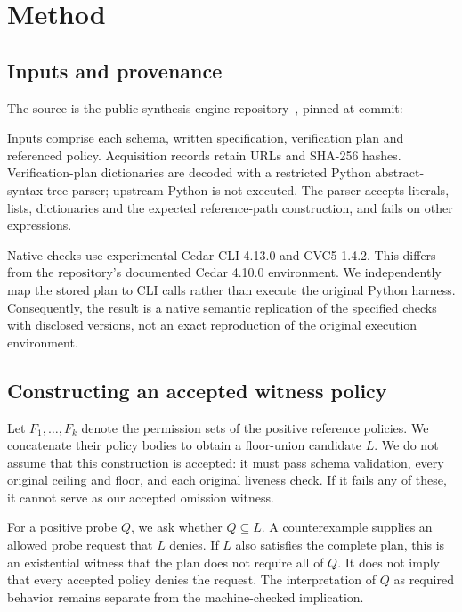 \documentclass[sigconf,nonacm]{acmart}
\begin{document}
\section{Method}
\subsection{Inputs and provenance}
The source is the public synthesis-engine repository~\cite{artifact}, pinned at commit:
\par{}\par
Inputs comprise each schema, written specification, verification plan and referenced policy. Acquisition records retain URLs and SHA-256 hashes. Verification-plan dictionaries are decoded with a restricted Python abstract-syntax-tree parser; upstream Python is not executed. The parser accepts literals, lists, dictionaries and the expected reference-path construction, and fails on other expressions.

Native checks use experimental Cedar CLI 4.13.0 and CVC5 1.4.2. This differs from the repository's documented Cedar 4.10.0 environment. We independently map the stored plan to CLI calls rather than execute the original Python harness. Consequently, the result is a native semantic replication of the specified checks with disclosed versions, not an exact reproduction of the original execution environment.

\subsection{Constructing an accepted witness policy}
Let $F_1,\ldots,F_k$ denote the permission sets of the positive reference policies. We concatenate their policy bodies to obtain a floor-union candidate $L$. We do not assume that this construction is accepted: it must pass schema validation, every original ceiling and floor, and each original liveness check. If it fails any of these, it cannot serve as our accepted omission witness.

For a positive probe $Q$, we ask whether $Q\subseteq L$. A counterexample supplies an allowed probe request that $L$ denies. If $L$ also satisfies the complete plan, this is an existential witness that the plan does not require all of $Q$. It does not imply that every accepted policy denies the request. The interpretation of $Q$ as required behavior remains separate from the machine-checked implication.
\end{document}
